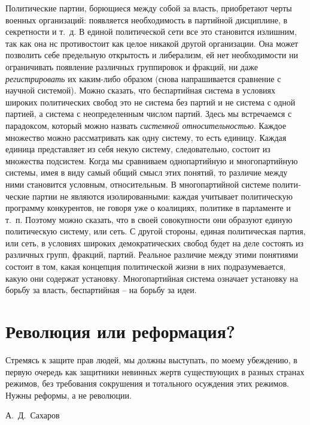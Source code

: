 \documentclass{book}
\begin{document}
Политические партии, борющиеся между собой за власть, приобретают черты военных организаций: появляется необхо­димость в партийной дисциплине, в секретности и т.~д. В единой политической сети все это становится излишним, так как она нс противостоит как целое никакой другой организации. Она может позволить себе предельную открытость и либерализм, ей нет необходимости ни ограничивать появление различных группировок и фракций, ни даже \textit{регистрировать}  их каким-либо образом (снова напрашивается сравнение с научной систе­мой). Можно сказать, что беспартийная система в условиях широких политических свобод это не система без партий и не система с одной партией, а система с неопределенным числом партий. Здесь мы встречаемся с парадоксом, который можно назвать \textit{системной относительностью}.  Каждое множество можно рассматривать как одну систему, то есть единицу. Каждая единица представляет из себя некую систему, следовательно, состоит из множества подсистем. Когда мы сравниваем одно­партийную и многопартийную системы, 
имея в виду самый об­щий смысл этих понятий, то различие между ними становится условным, относительным. В многопартийной системе полити­ческие партии не являются изолированными: каждая учиты­вает политическую программу конкурентов, не говоря уже о коалициях, политике в парламенте и т.~п. Поэтому можно ска­зать, что в своей совокупности они образуют единую полити­ческую систему, или сеть. С другой стороны, единая политиче­ская партия, или сеть, в условиях широких демократических свобод будет на деле состоять из различных групп, фракций, партий. Реальное различие между этими понятиями состоит в том, какая концепция политической жизни в них подразу­мевается, какую они содержат установку. Многопартийная система означает установку на борьбу за власть, беспартий­ная -- на борьбу за идеи.

\section{Революция или реформация?}

\epigraph{Стремясь к защите прав людей, мы должны выступать, по моему убеждению, в первую очередь как защитники невинных жертв существующих в разных странах режимов, без требования сокрушения и тотального осуждения этих режимов. Нужны реформы, а не революции.}{А.~Д.~Сахаров%
}
\end{document}

